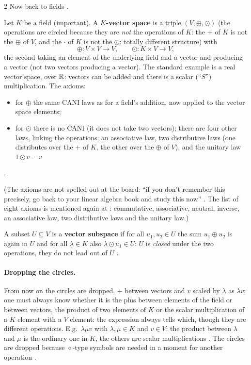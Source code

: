 \begin{paracol}{2}
Now back to fields .
\begin{definition}\label{def:te-vs}
Let $K$ be a field (important). A \textbf{$K$-vector space} is a triple $(V,\oplus,\odot)$ (the operations are circled because they are \emph{not} the operations of $K$: the $+$ of $K$ is not the $\oplus$ of $V$, and the $\cdot$ of $K$ is not the $\odot$: totally different structure) with
\[
  \oplus\colon V\times V\to V,\qquad \odot\colon K\times V\to V,
\]
the second taking an element of the underlying field and a vector and producing a vector (not two vectors producing a vector). The standard example is a real vector space, over $\mathbb{R}$: vectors can be added and there is a scalar (``$S$'') multiplication. The axioms:
\begin{itemize}
  \item for $\oplus$ the same CANI laws as for a field's addition, now applied to the vector space elements;
  \item for $\odot$ there is no CANI (it does not take two vectors); there are four other laws, linking the operations: an associative law, two distributive laws (one distributes over the $+$ of $K$, the other over the $\oplus$ of $V$), and the unitary law $1\odot v=v$
\end{itemize}
.
\end{definition}
(The axioms are not spelled out at the board: ``if you don't remember this precisely, go back to your linear algebra book and study this now'' . The list of eight axioms is mentioned again at : commutative, associative, neutral, inverse, an associative law, two distributive laws and the unitary law.)

A subset $U\subseteq V$ is a \textbf{vector subspace} if for all $u_1,u_2\in U$ the sum $u_1\oplus u_2$ is again in $U$ and for all $\lambda\in K$ also $\lambda\odot u_1\in U$: $U$ is \emph{closed} under the two operations, they do not lead out of $U$
.

\paragraph{Dropping the circles.} From now on the circles are dropped, $+$ between vectors and $v$ scaled by $\lambda$ as $\lambda v$; one must always know whether it is the plus between elements of the field or between vectors, the product of two elements of $K$ or the scalar multiplication of a $K$ element with a $V$ element:
the expression always tells which, though they are different operations. E.g.\ $\lambda\mu v$ with $\lambda,\mu\in K$ and $v\in V$: the product between $\lambda$ and $\mu$ is the ordinary one in $K$, the others are scalar multiplications .
The circles are dropped because $\diamond$-type symbols are needed in a moment for another operation .


\end{paracol}
